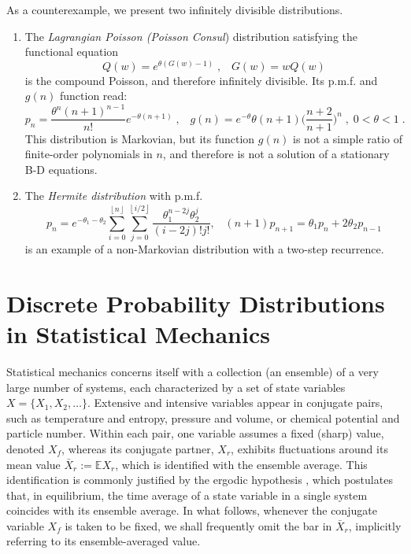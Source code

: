 \documentclass[a4paper,12pt]{amsart}
\theoremstyle{definition}
\theoremstyle{remark}
\begin{document}
As a counterexample, we present two infinitely divisible distributions.
\begin{enumerate}[label=(\roman*), leftmargin=*]
\item The {\it Lagrangian Poisson (Poisson Consul}) distribution \cite{JKK2005}  satisfying the functional equation
\begin{equation}\label{lagpoispgf}
Q(w)=e^{\theta(G(w)-1)}\;,\;\;\; G(w)=wQ(w)
\end{equation}
is the compound Poisson, and therefore infinitely divisible. Its p.m.f. and $g(n)$ function read:
\begin{equation}\label{lagpois}
 p_n=\frac{\theta^n (n+1)^{n-1}}{n!}e^{-\theta(n+1)}\;,\;\;\; g(n)=e^{-\theta } \theta (n+1) \Big(\frac{n+2}{n+1}\Big)^n\;,\;0<\theta<1\;.
\end{equation}
This distribution is Markovian, but its function $g(n)$ is not a simple ratio of finite-order polynomials in $n$, and therefore is not a solution of a stationary B-D equations. 

\item  The {\it Hermite distribution} \cite{JKK2005} with p.m.f.
\begin{equation}\label{Hermite_pmf}
  p_n=e^{-\theta_1-\theta_2}\sum_{i=0}^{\left \lfloor{n}\right \rfloor}\sum_{j=0}^{\left \lfloor{i/2}\right \rfloor}\frac{\theta_1^{n-2j}\theta_2^j}{(i-2j)!j!},\;\;\;(n+1)p_{n+1}=\theta_1p_n+2\theta_2p_{n-1}
\end{equation}
is an example of a non-Markovian distribution with a two-step recurrence.
\end{enumerate}


\newpage
\section{Discrete Probability Distributions in Statistical Mechanics} \label{statmech}
Statistical mechanics concerns itself with a collection (an ensemble) of a very large number of systems, each characterized by a set of state variables \(X=\{X_1, X_2,\ldots\}\). Extensive and intensive variables appear in conjugate pairs, such as temperature and entropy, pressure and volume, or chemical potential and particle number. Within each pair, one variable assumes a fixed (sharp) value, denoted \(X_f\), whereas its conjugate partner, \(X_r\), exhibits fluctuations around its mean value \(\bar{X}_r := \mathbb{E} X_r\), which is identified with the ensemble average. This identification is commonly justified by the ergodic hypothesis \cite{Hill}, which postulates that, in equilibrium, the time average of a state variable in a single system coincides with its ensemble average. In what follows, whenever the conjugate variable \(X_f\) is taken to be fixed, we shall frequently omit the bar in \(\bar{X}_r\), implicitly referring to its ensemble-averaged value.
\end{document}
